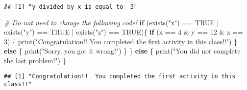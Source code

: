 \documentclass[
]{article}
\newenvironment{Shaded}{\begin{snugshade}}{\end{snugshade}}
\newcommand{\CommentTok}[1]{\textcolor[rgb]{0.56,0.35,0.01}{\textit{#1}}}
\newcommand{\ConstantTok}[1]{\textcolor[rgb]{0.00,0.00,0.00}{#1}}
\newcommand{\ControlFlowTok}[1]{\textcolor[rgb]{0.13,0.29,0.53}{\textbf{#1}}}
\newcommand{\DecValTok}[1]{\textcolor[rgb]{0.00,0.00,0.81}{#1}}
\newcommand{\FunctionTok}[1]{\textcolor[rgb]{0.00,0.00,0.00}{#1}}
\newcommand{\NormalTok}[1]{#1}
\newcommand{\SpecialCharTok}[1]{\textcolor[rgb]{0.00,0.00,0.00}{#1}}
\newcommand{\StringTok}[1]{\textcolor[rgb]{0.31,0.60,0.02}{#1}}
\begin{document}
\begin{verbatim}
## [1] "y divided by x is equal to  3"
\end{verbatim}

\begin{Shaded}
\begin{Highlighting}[]
\CommentTok{\# Do not need to change the following code!}
\ControlFlowTok{if}\NormalTok{ (}\FunctionTok{exists}\NormalTok{(}\StringTok{"x"}\NormalTok{) }\SpecialCharTok{==} \ConstantTok{TRUE} \SpecialCharTok{|} \FunctionTok{exists}\NormalTok{(}\StringTok{"y"}\NormalTok{) }\SpecialCharTok{==} \ConstantTok{TRUE} \SpecialCharTok{|} \FunctionTok{exists}\NormalTok{(}\StringTok{"z"}\NormalTok{) }\SpecialCharTok{==} \ConstantTok{TRUE}\NormalTok{)\{}
  \ControlFlowTok{if}\NormalTok{ (x }\SpecialCharTok{==} \DecValTok{4} \SpecialCharTok{\&}\NormalTok{ y }\SpecialCharTok{==} \DecValTok{12} \SpecialCharTok{\&}\NormalTok{ z }\SpecialCharTok{==} \DecValTok{3}\NormalTok{) \{}
  \FunctionTok{print}\NormalTok{(}\StringTok{"Congratulation!!  You completed the first activity in this class!!"}\NormalTok{)}
\NormalTok{  \} }\ControlFlowTok{else}\NormalTok{ \{}
    \FunctionTok{print}\NormalTok{(}\StringTok{"Sorry, you got it wrong!"}\NormalTok{)}
\NormalTok{  \}}
\NormalTok{\} }\ControlFlowTok{else}\NormalTok{ \{}
  \FunctionTok{print}\NormalTok{(}\StringTok{"You did not complete the last problem!"}\NormalTok{)}
\NormalTok{\}}
\end{Highlighting}
\end{Shaded}

\begin{verbatim}
## [1] "Congratulation!!  You completed the first activity in this class!!"
\end{verbatim}
\end{document}
